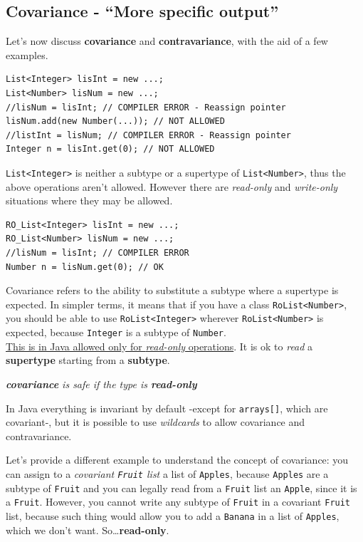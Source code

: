 \subsection{Covariance - ``More specific output''}
Let's now discuss \textbf{covariance} and \textbf{contravariance}, with the aid of a few examples.

\begin{lstlisting}
List<Integer> lisInt = new ...;
List<Number> lisNum = new ...;
//lisNum = lisInt; // COMPILER ERROR - Reassign pointer
lisNum.add(new Number(...)); // NOT ALLOWED
//listInt = lisNum; // COMPILER ERROR - Reassign pointer
Integer n = lisInt.get(0); // NOT ALLOWED
\end{lstlisting}

\lstinline|List<Integer>| is neither a subtype or a supertype of \lstinline|List<Number>|,
thus the above operations aren't allowed.
However there are \textit{read-only} and \textit{write-only} situations where they may be allowed.

\begin{lstlisting}
RO_List<Integer> lisInt = new ...;
RO_List<Number> lisNum = new ...;
//lisNum = lisInt; // COMPILER ERROR
Number n = lisNum.get(0); // OK
\end{lstlisting}
Covariance refers to the ability to substitute a subtype where a supertype is expected. In simpler terms, it means that if you have a class \lstinline|RoList<Number>|, you should be able to use \lstinline|RoList<Integer>| wherever \lstinline|RoList<Number>| is expected, because \lstinline|Integer| is a subtype of \lstinline|Number|.\\
\ul{This is in Java allowed only for \textit{read-only} operations}.
It is ok to \textit{read} a \textbf{supertype} starting from a \textbf{subtype}.
\begin{center}
   \textit{\textbf{covariance} is safe if the type is \textbf{read-only}}
\end{center}

In Java everything is invariant by default -except for \lstinline|arrays[]|, which are covariant-, but it is possible to use \textit{wildcards} to allow covariance and contravariance.

Let's provide a different example to understand the concept of covariance:
you can assign to a \textit{covariant \texttt{Fruit} list} a list of \texttt{Apples}, because \texttt{Apples} are a subtype of \texttt{Fruit} and you can legally read from a \texttt{Fruit} list an \texttt{Apple}, since it is a \texttt{Fruit}.
However, you cannot write any subtype of \texttt{Fruit} in a covariant \texttt{Fruit} list, because such thing would allow you to add a \texttt{Banana} in a list of \texttt{Apples}, which we don't want. So\dots \textbf{read-only}.

